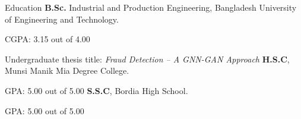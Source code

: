 \begin{rubric}{Education}
\entry*[2020 -- 2025]%
	\textbf{B.Sc.} Industrial and Production Engineering, Bangladesh University of Engineering and Technology.
    \par CGPA: 3.15 out of 4.00
	\par Undergraduate thesis title: \emph{Fraud Detection -- A GNN-GAN Approach}
%
\entry*[2017 -- 2019]%
	\textbf{H.S.C}, Munsi Manik Mia Degree College.
    \par GPA: 5.00 out of 5.00
% 
\entry*[2015 -- 2017]%
	\textbf{S.S.C}, Bordia High School.
    \par GPA: 5.00 out of 5.00
\end{rubric}

